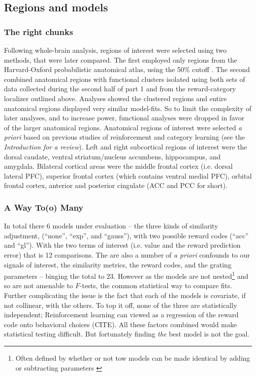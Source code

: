 \documentclass[doc,12pt]{apa}        %
\begin{document}
\subsection{Regions and models}
\label{sub:regoins}
\subsubsection{The right chunks}
\label{subsub:chunks}
Following whole-brain analysis, regions of interest were selected using two methods, that were later compared.  The first employed only regions from the Harvard-Oxford probabilistic anatomical atlas, using the 50\% cutoff \cite{Desikan:2006p9370}.  The second combined anatomical regions with functional clusters isolated using both sets of data collected during the second half of part 1 and from the reward-category localizer outlined above.  Analyses showed the clustered regions and entire anatomical regions displayed very similar model-fits.  So to limit the complexity of later analyses, and to increase power, functional analyses were dropped in favor of the larger anatomical regions.  Anatomical regions of interest were selected \emph{a priori} based on previous studies of reinforcement and category learning (see the \emph{Introduction for a review}).  Left and right subcortical regions of interest were the dorsal caudate, ventral striatum/nucleus accumbens, hippocampus, and amygdala.   Bilateral cortical areas were the middle frontal cortex (i.e. dorsal lateral PFC), superior frontal cortex (which contains ventral medial PFC), orbital frontal cortex, anterior and posterior cingulate (ACC and PCC for short).

\subsubsection{A Way To(o) Many}
\label{subsub:tomany}
In total there 6 models under evaluation -- the three kinds of similarity adjustment, (``none'', ``exp'', and ``gauss''), with two possible reward codes (``acc'' and ``gl'').  With the two terms of interest (i.e. value and the reward prediction error) that is 12 comparisons.  The are also a number of \emph{a priori} confounds to our signals of interest, the similarity metrics, the reward codes, and the grating parameters -- binging the total to 23.  However as the models are not nested\footnote{
    Often defined by whether or not tow models can be made identical by adding or subtracting parameters \cite{Forster:2000p9623}} and so are not amenable to $F$-tests, the common statistical way to compare fits.  Further complicating the issue is the fact that each of the models is covariate, if not collinear, with the others.  To top it off, none of the three are statistically independent; Reinforcement learning can viewed as a regression of the reward code onto behavioral choices (CITE).  All these factors combined would make statistical testing difficult.  But fortunately finding \emph{the} best model is not the goal.  
\end{document}
